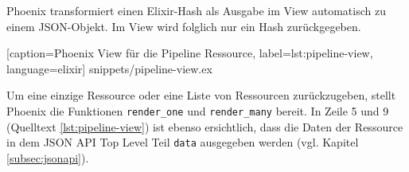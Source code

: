 Phoenix transformiert einen Elixir-Hash als Ausgabe im View automatisch zu einem JSON-Objekt. Im View wird folglich nur ein Hash zurückgegeben.


  [caption={Phoenix View für die Pipeline Ressource},
  label={lst:pipeline-view},
  language=elixir]
  {snippets/pipeline-view.ex}

Um eine einzige Ressource oder eine Liste von Ressourcen zurückzugeben, stellt Phoenix die Funktionen \texttt{render\_one} und \texttt{render\_many} bereit. In Zeile 5 und 9 (Quelltext \ref{lst:pipeline-view}) ist ebenso ersichtlich, dass die Daten der Ressource in dem JSON API Top Level Teil \texttt{data} ausgegeben werden (vgl. Kapitel \ref{subsec:jsonapi}).
